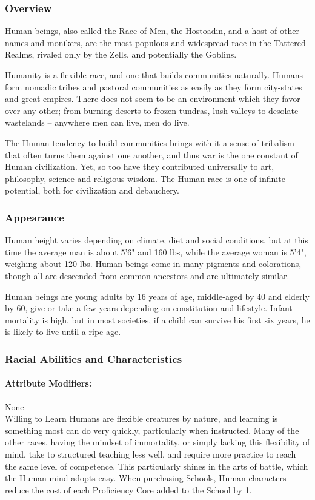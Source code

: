\documentclass[oneside,11pt,english]{book}
\begin{document}
\subsubsection*{Overview}
Human beings, also called the Race of Men, the Hostoadin, and a host of other names and monikers, are the most populous and widespread race in the Tattered Realms, rivaled only by the Zells, and potentially the Goblins. 


Humanity is a flexible race, and one that builds communities naturally. Humans form nomadic tribes and 
pastoral communities as easily as they form city-states and great empires. There does not seem to be an 
environment which they favor over any other; from burning deserts to frozen tundras, lush valleys to 
desolate wastelands -- anywhere men can live, men do live. 
 

The Human tendency to build communities brings with it a sense of tribalism that often turns them 
against one another, and thus war is the one constant of Human civilization. Yet, so too have they 
contributed universally to art, philosophy, science and religious wisdom. The Human race is one of 
infinite potential, both for civilization and debauchery. 
 

\subsubsection*{Appearance} 
Human height varies depending on climate, diet and social conditions, but at this time the average man is 
about 5'6" and 160 lbs, while the average woman is 5'4", weighing about 120 lbs. Human beings come in 
many pigments and colorations, though all are descended from common ancestors and are ultimately 
similar. 


Human beings are young adults by 16 years of age, middle-aged by 40 and elderly by 60, give or take a 
few years depending on constitution and lifestyle. Infant mortality is high, but in most societies, if a child 
can survive his first six years, he is likely to live until a ripe age. 
 

\subsubsection*{Racial Abilities and Characteristics} 
\paragraph{Attribute Modifiers:} None\\
Willing to Learn
Humans are flexible creatures by nature, and learning is something most can do very quickly, 
particularly when instructed. Many of the other races, having the mindset of immortality, or 
simply lacking this flexibility of mind, take to structured teaching less well, and require more 
practice to reach the same level of competence. This particularly shines in the arts of battle, which 
the Human mind adopts easy. When purchasing Schools, Human characters reduce the cost of 
each Proficiency Core added to the School by 1. 
\end{document}
